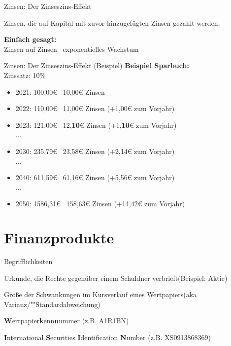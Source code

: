 \documentclass{beamer}
\begin{document}
			\begin{frame}{Zinsen: Der Zinseszins-Effekt}
				\begin{definition}
					Zinsen, die auf Kapital mit zuvor hinzugefügten Zinsen gezahlt werden.
				\end{definition}
				\textbf{Einfach gesagt:}\\
				Zinsen auf Zinsen \textrightarrow\ exponentielles Wachstum
			\end{frame}
			
			\begin{frame}{Zinsen: Der Zinseszins-Effekt (Beispiel)}
				\textbf{Beispiel Sparbuch:}\\
				Zinssatz: 10\%
				\begin{itemize}
					\item 2021: 100,00€ \textrightarrow\ 10,00€ Zinsen
					\item 2022: 110,00€ \textrightarrow\ 11,00€ Zinsen (+1,00€ zum Vorjahr)
					\item 2023: 121,00€ \textrightarrow\ 12,\textbf{10}€ Zinsen (+1,\textbf{10}€ zum Vorjahr)\pause\\...
					\item 2030: 235,79€ \textrightarrow\ 23,58€ Zinsen (+2,14€ zum Vorjahr)\\...
					\item 2040: 611,59€ \textrightarrow\ 61,16€ Zinsen (+5,56€ zum Vorjahr)\\...
					\item 2050: 1586,31€ \textrightarrow\ 158,63€ Zinsen (+14,42€ zum Vorjahr)
				\end{itemize}
			\end{frame}
	
	\section{Finanzprodukte}
	
		\begin{frame}
		\end{frame}
	
		\begin{frame}{Begrifflichkeiten}
			\begin{description}[labelwidth=0cm]
				\item[Wertpapier] Urkunde, die Rechte gegenüber einem Schuldner verbrieft(Beispiel: Aktie)
				\item[Volatilität] Größe der Schwankungen im Kursverlauf eines Wertpapiers(aka Varianz/""Standardabweichung)
				\item[WKN] \textbf{W}ertpapier\textbf{k}enn\textbf{n}ummer (z.B. A1R1BN)
				\item[ISIN] \textbf{I}nternational \textbf{S}ecurities \textbf{I}dentification \textbf{N}umber (z.B. XS0913868369)
			\end{description}
		\end{frame}
	
\end{document}
